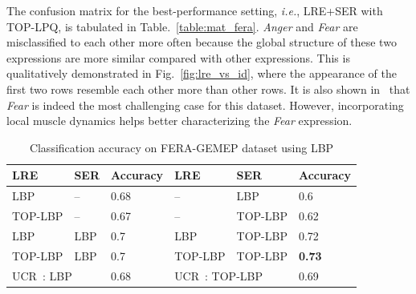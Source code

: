 \documentclass[journal]{IEEEtran}
\begin{document}
The confusion matrix for the best-performance setting, \textit{i.e.}, LRE+SER with TOP-LPQ, is tabulated in Table.~\ref{table:mat_fera}. \textit{Anger} and \textit{Fear} are misclassified to each other more often because the global structure of these two expressions are more similar compared with other expressions. This is qualitatively demonstrated in Fig.~\ref{fig:lre_vs_id}, where the appearance of the first two rows resemble each other more than other rows. It is also shown in~\cite{Valstar12} that \textit{Fear} is indeed the most challenging case for this dataset. However, incorporating local muscle dynamics helps better characterizing the \textit{Fear} expression. 




\begin{table}[!t]
\caption{Classification accuracy on FERA-GEMEP dataset using LBP\label{table:comp_lbp}}
\centering
\scriptsize
\begin{tabular}{l|l|l||l|l|l}
\toprule
LRE & SER & Accuracy	& LRE	& SER	& Accuracy \\ \midrule 
LBP	& --		& 0.68	& -- & LBP & 0.6 \\
TOP-LBP & -- & 0.67 & -- & TOP-LBP & 0.62 \\
LBP & LBP & 0.7 & LBP & TOP-LBP & 0.72 \\
TOP-LBP & LBP & 0.7 & TOP-LBP & TOP-LBP & \textbf{0.73} \\ \midrule
\multicolumn{2}{l}{UCR~\cite{Yang_SMCB12}: LBP} & 0.68 & \multicolumn{2}{l}{UCR~\cite{Yang_SMCB12}: TOP-LBP} & 0.69 \\
\bottomrule

\end{tabular}
\end{table}
\end{document}

